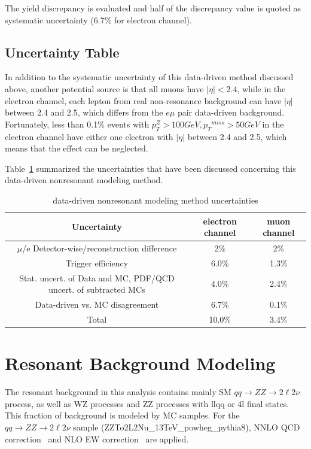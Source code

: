 \vspace{0.3cm}
The yield discrepancy is evaluated and half of the discrepancy value is quoted as systematic uncertainty (6.7\% for electron channel).

\subsection{Uncertainty Table}
In addition to the systematic uncertainty of this data-driven method discussed above, another potential source is that all muons have $|\eta|<2.4$, while in the electron channel, each lepton from real non-resonance background can have $|\eta|$ between 2.4 and 2.5, which differs from the $e\mu$ pair data-driven background. Fortunately, less than 0.1\% events with $p_{T}^{Z}>100GeV, {p_{T}}^{miss}>50GeV$ in the electron channel have either one electron with $|\eta|$ between 2.4 and 2.5, which means that the effect can be neglected. 

\vspace{0.3cm}
Table~\ref{tab:nonresuncert} summarized the uncertainties that have been discussed concerning this data-driven nonresonant modeling method.
\begin{table}[htbp]
  \begin{center}
    \caption{
      data-driven nonresonant modeling method uncertainties
      \label{tab:nonresuncert}}
    \begin{tabular}{c|c c}
      \hline\hline
      Uncertainty & electron channel & muon channel \\
      \hline
      $\mu$/e Detector-wise/reconstruction difference & 2\% & 2\% \\
      Trigger efficiency & 6.0\% & 1.3\% \\
      Stat. uncert. of Data and MC, PDF/QCD uncert. of subtracted MCs  & 4.0\% & 2.4\% \\
      Data-driven vs. MC disagreement & 6.7\% & 0.1\% \\
      \hline
      Total  & 10.0\% & 3.4\% \\
      \hline\hline
    \end{tabular}
  \end{center}
\end{table}


\section{Resonant Background Modeling}
The resonant background in this analysis contains mainly SM $qq\rightarrow ZZ\rightarrow 2\ell 2\nu$ process, as well as WZ processes and ZZ processes with llqq or 4l final states. This fraction of background is modeled by MC samples. For the $qq\rightarrow ZZ\rightarrow 2\ell 2\nu$ sample (ZZTo2L2Nu\_13TeV\_powheg\_pythia8), NNLO QCD correction~\cite{bg_nnloqcd} and NLO EW correction~\cite{bg_nloqed1,bg_nloqed2} are applied.

